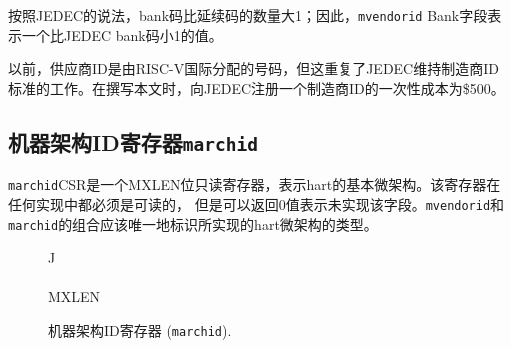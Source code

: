 \iffalse
\begin{commentary}
In JEDEC's parlance, the bank number is one greater than the number of
continuation codes; hence, the {\tt mvendorid} Bank field encodes a value
that is one less than the JEDEC bank number.
\end{commentary}
\fi

\begin{commentary}
按照JEDEC的说法，bank码比延续码的数量大1；因此，{\tt mvendorid} Bank字段表示一个比JEDEC bank码小1的值。
\end{commentary}

\iffalse
\begin{commentary}
Previously the vendor ID was to be a number allocated by RISC-V
International, but this duplicates the work of JEDEC in maintaining a
manufacturer ID standard.  At time of writing, registering a
manufacturer ID with JEDEC has a one-time cost of \$500.
\end{commentary}
\fi

\begin{commentary}
以前，供应商ID是由RISC-V国际分配的号码，但这重复了JEDEC维持制造商ID标准的工作。在撰写本文时，向JEDEC注册一个制造商ID的一次性成本为\$500。
\end{commentary}

\subsection{机器架构ID寄存器{\tt marchid}}

\iffalse
The {\tt marchid} CSR is an MXLEN-bit read-only register encoding the
base microarchitecture of the hart.  This register must be readable in
any implementation, but a value of 0 can be returned to indicate the
field is not implemented.  The combination of {\tt mvendorid} and {\tt
  marchid} should uniquely identify the type of hart microarchitecture
that is implemented.
\fi

{\tt marchid}CSR是一个MXLEN位只读寄存器，表示hart的基本微架构。该寄存器在任何实现中都必须是可读的，
但是可以返回0值表示未实现该字段。{\tt mvendorid}和{\tt marchid}的组合应该唯一地标识所实现的hart微架构的类型。

\begin{figure*}[h!]
{\footnotesize
\begin{center}
\begin{tabular}{J}
 \\
\hline
{} \\
\hline
MXLEN \\
\end{tabular}
\end{center}
}
\vspace{-0.1in}
\caption{机器架构ID寄存器 ({\tt marchid}).}
\label{marchreg}
\end{figure*}

